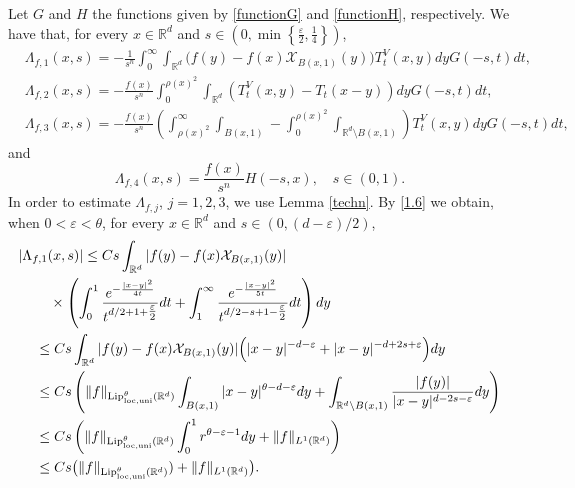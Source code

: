 \documentclass[10pt, a4paper, reqno]{amsart}
\theoremstyle{definition}
\theoremstyle{remark}
\numberwithin{equation}{section}
\begin{document}
Let $G$ and $H$ the functions given by \eqref{functionG} and \eqref{functionH}, respectively. We have that, for every $x\in \mathbb R^d$ and $s\in (0,\min\left\{\tfrac{\varepsilon}{2},\tfrac{1}{4}\right\})$,
\begin{align*}
    &\Lambda_{f,1}(x,s)=-\frac{1}{s^n}\int_0^\infty\int_{\mathbb R^d}\big(f(y)-f(x)\mathcal X_{B(x,1)}(y)\big)T_t^V(x,y)dyG(-s,t)dt,\\
    &\Lambda_{f,2}(x,s)=-\frac{f(x)}{s^n}\int_0^{\rho (x)^2}\int_{\mathbb R^d}(T_t^V(x,y)-T_t(x-y))dyG(-s,t)dt,\\
    &\Lambda_{f,3}(x,s)=-\frac{f(x)}{s^n}\left(\int_{\rho (x)^2}^\infty\int_{B(x,1)}-\int_0^{\rho (x)^2}\int_{\mathbb R^d\setminus B(x,1)} \right)T_t^V(x,y)dyG(-s,t)dt,
\end{align*}
and
\[
\Lambda_{f,4}(x,s)=\frac{f(x)}{s^n}H(-s,x),\quad s\in (0,1).
\]
In order to estimate $\Lambda_{f,j}$, $j=1,2,3$, we use Lemma \ref{techn}. By \eqref{1.6} we obtain, when $0<\varepsilon<\theta$, for every $x\in \mathbb R^d$ and $s\in (0,(d-\varepsilon)/2)$,
\begin{align*}
|\Lambda_{f,1}(x,s)|&\leq Cs\int_{\mathbb R^d} |f(y)-f(x)\mathcal X_{B(x,1)}(y)|\\
 &\hspace{-1.2cm}\quad \times \left(\int_0^1\frac{e^{-\frac{|x-y|^2}{4t}}}{t^{d/2+1+\tfrac{\varepsilon}{2}}}dt+\int_1^\infty \frac{e^{-\frac{|x-y|^2}{5t}}}{t^{d/2-s+1-\tfrac{\varepsilon}{2}}}dt\right)dy\\
 &\hspace{-1.2cm}\leq Cs\int_{\mathbb R^d} |f(y)-f(x)\mathcal X_{B(x,1)}(y)|\Big(|x-y|^{-d-\varepsilon}+|x-y|^{-d+2s+\varepsilon}\Big)dy\\
&\hspace{-1.2cm}\leq Cs\left(\|f\|_{{\textup{Lip}}^\theta_{\rm loc,uni}(\mathbb R^d)}\int_{B(x,1)}|x-y|^{\theta-d-\varepsilon}dy+\int_{\mathbb R^d\setminus B(x,1)}\frac{|f(y)|}{|x-y|^{d-2s-\varepsilon}}dy\right)\\
&\hspace{-1.2cm}\leq Cs\left(\|f\|_{{\textup{Lip}}^\theta_{\rm loc,uni}(\mathbb R^d)}\int_0^1r^{\theta-\varepsilon-1}dy+\|f\|_{L^1(\mathbb R^d)}\right)\\
&\hspace{-1.2cm}\leq Cs\big(\|f\|_{{\textup{Lip}}^\theta_{\rm loc,uni}(\mathbb R^d)})+\|f\|_{L^1(\mathbb R^d)}\big).
\end{align*}
\end{document}
